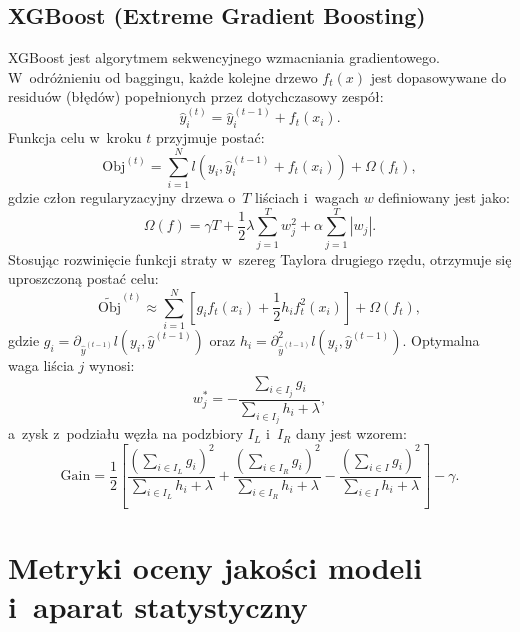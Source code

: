 \subsection{XGBoost (Extreme Gradient Boosting)}
XGBoost \cite{ChenGuestrin2016} jest algorytmem sekwencyjnego wzmacniania gradientowego. W~odróżnieniu od baggingu, każde kolejne drzewo $f_t(x)$ jest dopasowywane do residuów (błędów) popełnionych przez dotychczasowy zespół:
\begin{equation}
\hat{y}_i^{(t)} = \hat{y}_i^{(t-1)} + f_t(x_i).
\end{equation}
Funkcja celu w~kroku $t$ przyjmuje postać:
\begin{equation}
\mathrm{Obj}^{(t)} = \sum_{i=1}^{N} l(y_i, \hat{y}_i^{(t-1)} + f_t(x_i)) + \Omega(f_t),
\end{equation}
gdzie człon regularyzacyjny drzewa o~$T$ liściach i~wagach $w$ definiowany jest jako:
\begin{equation}
\Omega(f) = \gamma T + \frac{1}{2} \lambda \sum_{j=1}^{T} w_j^2 + \alpha \sum_{j=1}^{T} |w_j|.
\end{equation}
Stosując rozwinięcie funkcji straty w~szereg Taylora drugiego rzędu, otrzymuje się uproszczoną postać celu:
\begin{equation}
\widetilde{\mathrm{Obj}}^{(t)} \approx \sum_{i=1}^{N} \left[ g_i f_t(x_i) + \frac{1}{2} h_i f_t^2(x_i) \right] + \Omega(f_t),
\end{equation}
gdzie $g_i = \partial_{\hat{y}^{(t-1)}} l(y_i, \hat{y}^{(t-1)})$ oraz $h_i = \partial^2_{\hat{y}^{(t-1)}} l(y_i, \hat{y}^{(t-1)})$. Optymalna waga liścia $j$ wynosi:
\begin{equation}
w_j^* = -\frac{\sum_{i \in I_j} g_i}{\sum_{i \in I_j} h_i + \lambda},
\end{equation}
a~zysk z~podziału węzła na podzbiory $I_L$ i~$I_R$ dany jest wzorem:
\begin{equation}
\mathrm{Gain} = \frac{1}{2} \left[ \frac{(\sum_{i \in I_L} g_i)^2}{\sum_{i \in I_L} h_i + \lambda} + \frac{(\sum_{i \in I_R} g_i)^2}{\sum_{i \in I_R} h_i + \lambda} - \frac{(\sum_{i \in I} g_i)^2}{\sum_{i \in I} h_i + \lambda} \right] - \gamma.
\end{equation}

\section{Metryki oceny jakości modeli i~aparat statystyczny}

